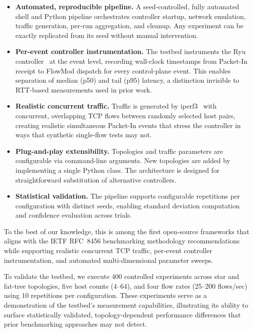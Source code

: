 \documentclass[conference]{IEEEtran}
\begin{document}
\begin{itemize}
  \item \textbf{Automated, reproducible pipeline.} A seed-controlled,
  fully automated shell and Python pipeline orchestrates controller
  startup, network emulation, traffic generation, per-run
  aggregation, and cleanup. Any experiment can be exactly replicated
  from its seed without manual intervention.

  \item \textbf{Per-event controller instrumentation.} The testbed
  instruments the Ryu controller~\cite{RyuFramework} at the
  event level, recording wall-clock timestamps from Packet-In
  receipt to FlowMod dispatch for every control-plane event.
  This enables separation of median (p50) and tail (p95) latency,
  a distinction invisible to RTT-based measurements used in
  prior work.

  \item \textbf{Realistic concurrent traffic.} Traffic is generated
  by iperf3~\cite{iperf3} with concurrent, overlapping TCP flows
  between randomly selected host pairs, creating realistic
  simultaneous Packet-In events that stress the controller in
  ways that synthetic single-flow tests may not.

  \item \textbf{Plug-and-play extensibility.} Topologies and
  traffic parameters are configurable via command-line arguments.
  New topologies are added by implementing a single Python class.
  The architecture is designed for straightforward substitution
  of alternative controllers.

  \item \textbf{Statistical validation.} The pipeline supports
  configurable repetitions per configuration with distinct seeds,
  enabling standard deviation computation and confidence evaluation
  across trials.
\end{itemize}

To the best of our knowledge, this is among the first open-source
frameworks that aligns with the IETF RFC~8456 benchmarking
methodology recommendations while supporting realistic concurrent
TCP traffic, per-event controller instrumentation, and automated
multi-dimensional parameter sweeps.

To validate the testbed, we execute 400 controlled experiments
across star and fat-tree topologies, five host counts (4--64),
and four flow rates (25--200 flows/sec) using 10 repetitions
per configuration. These experiments serve as a demonstration
of the testbed's measurement capabilities, illustrating its
ability to surface statistically validated, topology-dependent
performance differences that prior benchmarking approaches
may not detect.
\end{document}
